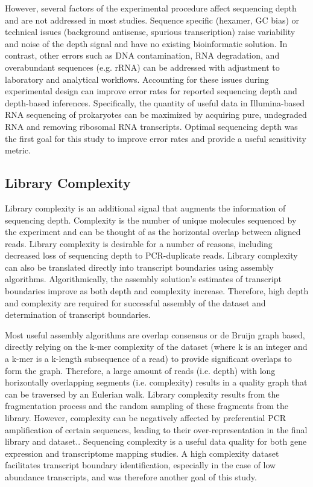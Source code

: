 However, several factors of the experimental procedure affect sequencing depth and are not addressed in most studies. Sequence specific (hexamer,\cite{174} GC\cite{175} bias) or technical issues (background antisense,\cite{18} spurious transcription\cite{164,165}) raise variability and noise of the depth signal and have no existing bioinformatic solution. In contrast, other errors such as DNA contamination, RNA degradation, and overabundant sequences (e.g. rRNA) can be addressed with adjustment to laboratory and analytical workflows. Accounting for these issues during experimental design can improve error rates for reported sequencing depth and depth-based inferences. Specifically, the quantity of useful data in Illumina-based RNA sequencing of prokaryotes can be maximized by acquiring pure, undegraded RNA and removing ribosomal RNA transcripts. Optimal sequencing depth was the first goal for this study to improve error rates and provide a useful sensitivity metric.

\subsection{Library Complexity}
Library complexity is an additional signal that augments the information of sequencing depth. Complexity is the number of unique molecules sequenced by the experiment and can be thought of as the horizontal overlap between aligned reads.\cite{182} Library complexity is desirable for a number of reasons, including decreased loss of sequencing depth to PCR-duplicate reads.\cite{57,182,108} Library complexity can also be translated directly into transcript boundaries using assembly algorithms.\cite{108,58} Algorithmically, the assembly solution's estimates of transcript boundaries improve as both depth and complexity increase. Therefore, high depth and complexity are required for successful assembly of the dataset and determination of transcript boundaries.

Most useful assembly algorithms are overlap consensus or de Bruijn graph based, directly relying on the k-mer complexity of the dataset (where k is an integer and a k-mer is a k-length subsequence of a read) to provide significant overlaps to form the graph.\cite{108,58} Therefore, a large amount of reads (i.e. depth) with long horizontally overlapping segments (i.e. complexity) results in a quality graph that can be traversed by an Eulerian walk. Library complexity results from the fragmentation process and the random sampling of these fragments from the library. However, complexity can be negatively affected by preferential PCR amplification of certain sequences, leading to their over-representation in the final library and dataset.\cite{108,174,175}. Sequencing complexity is a useful data quality for both gene expression and transcriptome mapping studies. A high complexity dataset facilitates transcript boundary identification, especially in the case of low abundance transcripts, and was therefore another goal of this study.

